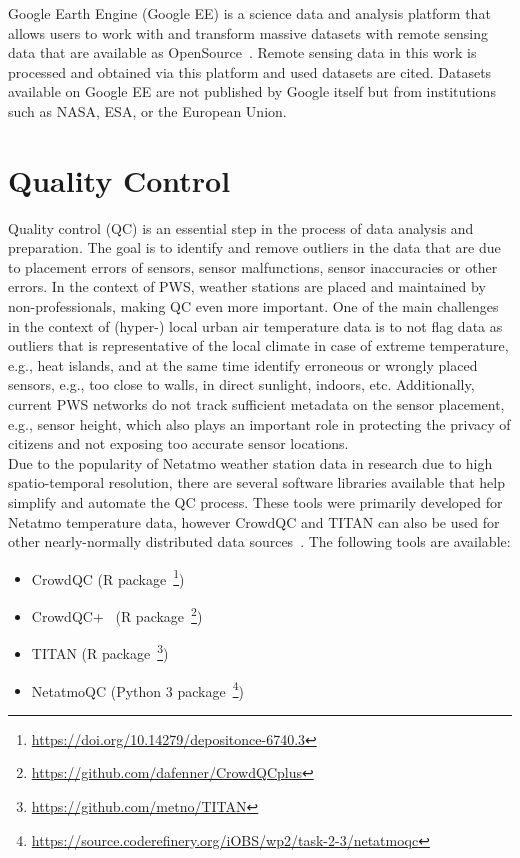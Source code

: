 Google Earth Engine (Google EE) is a science data and analysis platform that allows users to work with and transform massive datasets with remote sensing data that are available as OpenSource~\cite{gorelick2017google}. Remote sensing data in this work is processed and obtained via this platform and used datasets are cited. Datasets available on Google EE are not published by Google itself but from institutions such as NASA, ESA, or the European Union.

\section{Quality Control}
\label{sec:quality control}

Quality control (QC) is an essential step in the process of data analysis and preparation. The goal is to identify and remove outliers in the data that are due to placement errors of sensors, sensor malfunctions, sensor inaccuracies or other errors. In the context of PWS, weather stations are placed and maintained by non-professionals, making QC even more important. One of the main challenges in the context of (hyper-) local urban air temperature data is to not flag data as outliers that is representative of the local climate in case of extreme temperature, e.g., heat islands, and at the same time identify erroneous or wrongly placed sensors, e.g., too close to walls, in direct sunlight, indoors, etc. Additionally, current PWS networks do not track sufficient metadata on the sensor placement, e.g., sensor height, which also plays an important role in protecting the privacy of citizens and not exposing too accurate sensor locations.\\
Due to the popularity of Netatmo weather station data in research due to high spatio-temporal resolution, there are several software libraries available that help simplify and automate the QC process. These tools were primarily developed for Netatmo temperature data, however CrowdQC and TITAN can also be used for other nearly-normally distributed data sources~\cite{hahn2022observations}. The following tools are available:

\begin{itemize}
    \item CrowdQC (R package~\footnote{\url{https://doi.org/10.14279/depositonce-6740.3}})
    \item CrowdQC+~\cite{fenner2021crowdqc+} (R package~\footnote{\url{https://github.com/dafenner/CrowdQCplus}})
    \item TITAN (R package~\footnote{\url{https://github.com/metno/TITAN}})
    \item NetatmoQC (Python 3 package~\footnote{\url{https://source.coderefinery.org/iOBS/wp2/task-2-3/netatmoqc}})
\end{itemize}

